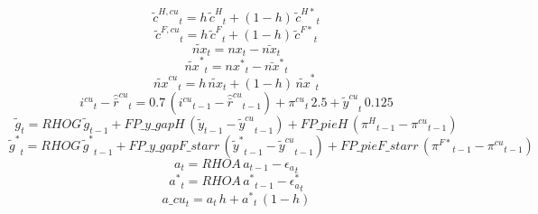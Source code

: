 \begin{dmath}
{{\tilde c^{H,cu}}}_{t}={{h}}\, {{\tilde c^H}}_{t}+\left(1-{{h}}\right)\, {{\tilde c^{H*}}}_{t}
\end{dmath}
\begin{dmath}
{{\tilde c^{F,cu}}}_{t}={{h}}\, {{\tilde c^F}}_{t}+\left(1-{{h}}\right)\, {{\tilde c^{F*}}}_{t}
\end{dmath}
\begin{dmath}
{{\tilde{nx}}}_{t}={{nx}}_{t}-{{\bar{nx}}}_{t}
\end{dmath}
\begin{dmath}
{{\tilde{nx}^*}}_{t}={{nx^*}}_{t}-{{\bar{nx}^*}}_{t}
\end{dmath}
\begin{dmath}
{{\tilde{nx}^{cu}}}_{t}={{h}}\, {{\tilde{nx}}}_{t}+\left(1-{{h}}\right)\, {{\tilde{nx}^*}}_{t}
\end{dmath}
\begin{dmath}
{{i^{cu}}}_{t}-{{\hat {\bar r}^{cu}}}_{t}=0.7\, \left({{i^{cu}}}_{t-1}-{{\hat {\bar r}^{cu}}}_{t-1}\right)+{{\pi^{cu}}}_{t}\, 2.5+{{\tilde y^{cu}}}_{t}\, 0.125
\end{dmath}
\begin{dmath}
{{\tilde g}}_{t}={RHOG}\, {{\tilde g}}_{t-1}+{FP\_y\_gapH}\, \left({{\tilde y}}_{t-1}-{{\tilde y^{cu}}}_{t-1}\right)+{FP\_pieH}\, \left({{\pi^H}}_{t-1}-{{\pi^{cu}}}_{t-1}\right)
\end{dmath}
\begin{dmath}
{{\tilde g^*}}_{t}={RHOG}\, {{\tilde g^*}}_{t-1}+{FP\_y\_gapF\_starr}\, \left({{\tilde y^*}}_{t-1}-{{\tilde y^{cu}}}_{t-1}\right)+{FP\_pieF\_starr}\, \left({{\pi^{F*}}}_{t-1}-{{\pi^{cu}}}_{t-1}\right)
\end{dmath}
\begin{dmath}
{{a}}_{t}={RHOA}\, {{a}}_{t-1}-{{\epsilon_a}}_{t}
\end{dmath}
\begin{dmath}
{{a^*}}_{t}={RHOA}\, {{a^*}}_{t-1}-{{\epsilon_a^*}}_{t}
\end{dmath}
\begin{dmath}
{a\_cu}_{t}={{a}}_{t}\, {{h}}+{{a^*}}_{t}\, \left(1-{{h}}\right)
\end{dmath}
